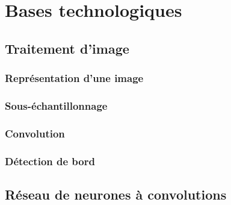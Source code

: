 \chapter{Bases technologiques}

\section{Traitement d'image}
\subsection{Représentation d'une image}\label{techno.traitement.repr}

\subsection{Sous-échantillonnage}
\subsection{Convolution}
\subsection{Détection de bord}

\section{Réseau de neurones à convolutions}

